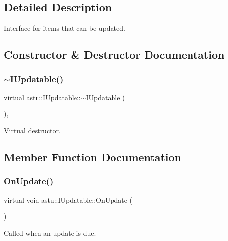 \subsection{Detailed Description}
Interface for items that can be updated. 

\subsection{Constructor \& Destructor Documentation}
\mbox{\label{classastu_1_1IUpdatable_ae0ba3ec6b901ef3dd3692471222180e6}} 
\subsubsection{\texorpdfstring{$\sim$\+I\+Updatable()}{~IUpdatable()}}
{\footnotesize\ttfamily virtual astu\+::\+I\+Updatable\+::$\sim$\+I\+Updatable (\begin{DoxyParamCaption}{ }\end{DoxyParamCaption})\hspace{0.3cm}{\ttfamily [inline]}, {\ttfamily [virtual]}}

Virtual destructor. 

\subsection{Member Function Documentation}
\mbox{\label{classastu_1_1IUpdatable_a76c7c6e2a71b725bbdbdf6808ef4743f}} 
\subsubsection{\texorpdfstring{On\+Update()}{OnUpdate()}}
{\footnotesize\ttfamily virtual void astu\+::\+I\+Updatable\+::\+On\+Update (\begin{DoxyParamCaption}{ }\end{DoxyParamCaption})\hspace{0.3cm}{\ttfamily [pure virtual]}}

Called when an update is due. 

